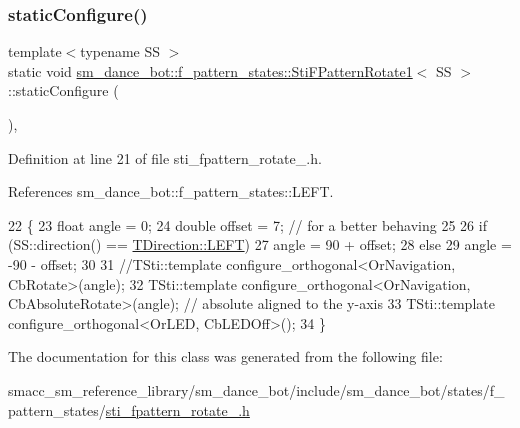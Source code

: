 \subsubsection{\texorpdfstring{static\+Configure()}{staticConfigure()}}
{\footnotesize\ttfamily template$<$typename SS $>$ \\
static void \hyperlink{structsm__dance__bot_1_1f__pattern__states_1_1StiFPatternRotate1}{sm\+\_\+dance\+\_\+bot\+::f\+\_\+pattern\+\_\+states\+::\+Sti\+F\+Pattern\+Rotate1}$<$ SS $>$\+::static\+Configure (\begin{DoxyParamCaption}{ }\end{DoxyParamCaption})\hspace{0.3cm}{\ttfamily [inline]}, {\ttfamily [static]}}



Definition at line 21 of file sti\+\_\+fpattern\+\_\+rotate\+\_.\+h.



References sm\+\_\+dance\+\_\+bot\+::f\+\_\+pattern\+\_\+states\+::\+L\+E\+FT.


\begin{DoxyCode}
22   \{
23     \textcolor{keywordtype}{float} angle = 0;
24     \textcolor{keywordtype}{double} offset = 7; \textcolor{comment}{// for a better behaving}
25 
26     \textcolor{keywordflow}{if} (SS::direction() == \hyperlink{namespacesm__dance__bot_1_1f__pattern__states_acc99b72745466e5dcee9272425a34e58a684d325a7303f52e64011467ff5c5758}{TDirection::LEFT})
27       angle = 90 + offset;
28     \textcolor{keywordflow}{else}
29       angle = -90 - offset;
30 
31      \textcolor{comment}{//TSti::template configure\_orthogonal<OrNavigation, CbRotate>(angle);}
32      TSti::template configure\_orthogonal<OrNavigation, CbAbsoluteRotate>(angle); \textcolor{comment}{// absolute aligned to the
       y-axis}
33      TSti::template configure\_orthogonal<OrLED, CbLEDOff>();
34   \}
\end{DoxyCode}


The documentation for this class was generated from the following file\+:\begin{DoxyCompactItemize}
\item 
smacc\+\_\+sm\+\_\+reference\+\_\+library/sm\+\_\+dance\+\_\+bot/include/sm\+\_\+dance\+\_\+bot/states/f\+\_\+pattern\+\_\+states/\hyperlink{include_2sm__dance__bot_2states_2f__pattern__states_2sti__fpattern__rotate__1_8h}{sti\+\_\+fpattern\+\_\+rotate\+\_.\+h}\end{DoxyCompactItemize}
